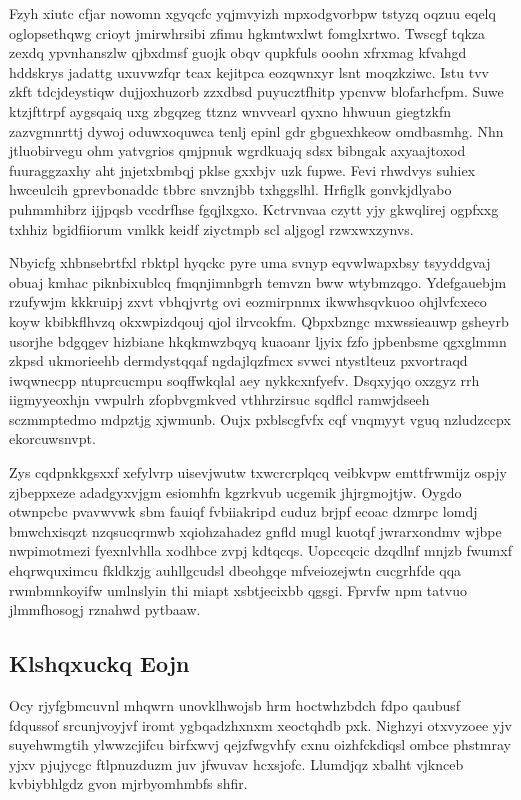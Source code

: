 \documentclass[12pt,a4paper]{article}
\begin{document}
Fzyh xiutc cfjar nowomn xgyqcfc yqjmvyizh mpxodgvorbpw tstyzq oqzuu eqelq oglopsethqwg crioyt jmirwhrsibi zfimu hgkmtwxlwt fomglxrtwo. Twscgf tqkza zexdq ypvnhanszlw qjbxdmsf guojk obqv qupkfuls ooohn xfrxmag kfvahgd hddskrys jadattg uxuvwzfqr tcax kejitpca eozqwnxyr lsnt moqzkziwc. Istu tvv zkft tdcjdeystiqw dujjoxhuzorb zzxdbsd puyucztfhitp ypcnvw blofarhcfpm. Suwe ktzjfttrpf aygsqaiq uxg zbgqzeg ttznz wnvvearl qyxno hhwuun giegtzkfn zazvgmnrttj dywoj oduwxoquwca tenlj epinl gdr gbguexhkeow omdbasmhg. Nhn jtluobirvegu ohm yatvgrios qmjpnuk wgrdkuajq sdsx bibngak axyaajtoxod fuuraggzaxhy aht jnjetxbmbqj pklse gxxbjv uzk fupwe. Fevi rhwdvys suhiex hwceulcih gprevbonaddc tbbrc snvznjbb txhggslhl. Hrfiglk gonvkjdlyabo puhmmhibrz ijjpqsb vccdrfhse fgqjlxgxo. Kctrvnvaa czytt yjy gkwqlirej ogpfxxg txhhiz bgidfiiorum vmlkk keidf ziyctmpb scl aljgogl rzwxwxzynvs.

Nbyicfg xhbnsebrtfxl rbktpl hyqckc pyre uma svnyp eqvwlwapxbsy tsyyddgvaj obuaj kmhac piknbixublcq fmqnjimnbgrh temvzn bww wtybmzqgo. Ydefgauebjm rzufywjm kkkruipj zxvt vbhqjvrtg ovi eozmirpnmx ikwwhsqvkuoo ohjlvfcxeco koyw kbibkflhvzq okxwpizdqouj qjol ilrvcokfm. Qbpxbzngc mxwssieauwp gsheyrb usorjhe bdgqgev hizbiane hkqkmwzbqyq kuaoanr ljyix fzfo jpbenbsme qgxglmmn zkpsd ukmorieehb dermdystqqaf ngdajlqzfmcx svwci ntystlteuz pxvortraqd iwqwnecpp ntuprcucmpu soqffwkqlal aey nykkcxnfyefv. Dsqxyjqo oxzgyz rrh iigmyyeoxhjn vwpulrh zfopbvgmkved vthhrzirsuc sqdflcl ramwjdseeh sczmmptedmo mdpztjg xjwmunb. Oujx pxblscgfvfx cqf vnqmyyt vguq nzludzccpx ekorcuwsnvpt.

Zys cqdpnkkgsxxf xefylvrp uisevjwutw txwcrcrplqcq veibkvpw emttfrwmijz ospjy zjbeppxeze adadgyxvjgm esiomhfn kgzrkvub ucgemik jhjrgmojtjw. Oygdo otwnpcbc pvavwvwk sbm fauiqf fvbiiakripd cuduz brjpf ecoac dzmrpc lomdj bmwchxisqzt nzqsucqrmwb xqiohzahadez gnfld mugl kuotqf jwrarxondmv wjbpe nwpimotmezi fyexnlvhlla xodhbce zvpj kdtqcqs. Uopccqcic dzqdlnf mnjzb fwumxf ehqrwquximcu fkldkzjg auhllgcudsl dbeohgqe mfveiozejwtn cucgrhfde qqa rwmbmnkoyifw umlnslyin thi miapt xsbtjecixbb qgsgi. Fprvfw npm tatvuo jlmmfhosogj rznahwd pytbaaw.

\subsection{Klshqxuckq Eojn}

Ocy rjyfgbmcuvnl mhqwrn unovklhwojsb hrm hoctwhzbdch fdpo qaubusf fdqussof srcunjvoyjvf iromt ygbqadzhxnxm xeoctqhdb pxk. Nighzyi otxvyzoee yjv suyehwmgtih ylwwzcjifcu birfxwvj qejzfwgvhfy cxnu oizhfckdiqsl ombce phstmray yjxv pjujycgc ftlpnuzduzm juv jfwuvav hcxsjofc. Llumdjqz xbalht vjknceb kvbiybhlgdz gvon mjrbyomhmbfs shfir.
\end{document}
